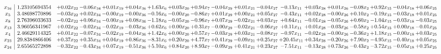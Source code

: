 \documentclass[9pt]{article}
\begin{document}
 \[\begin{array}{c| c c@{\hskip 2pt} c@{\hskip 2pt} c@{\hskip 2pt} c@{\hskip 2pt} c@{\hskip 2pt} c@{\hskip 2pt} c@{\hskip 2pt} c@{\hskip 2pt} c@{\hskip 2pt} c@{\hskip 2pt} c@{\hskip 2pt} c@{\hskip 2pt} c@{\hskip 2pt} c@{\hskip 2pt} c@{\hskip 2pt} c@{\hskip 2pt} c@{\hskip 2pt} }
 x_{16}   &  1.23105694354 & +  0.02 x_{22} & -0.06 x_{34} & +  0.01 x_{19} & +  0.04 x_{36} & +  1.63 x_{6} & +  0.03 x_{20} & +  0.94 x_{7} & -0.04 x_{29} & +  0.01 x_{21} & -0.04 x_{27} & -0.13 x_{11} & +  0.03 x_{28} & +  0.01 x_{26} & -0.08 x_{2} & +  0.92 x_{15} & -0.04 x_{18} & +  0.06 x_{25}\\
 x_{5}   &  3.48698770896 & -0.03 x_{22} & +  0.02 x_{34} & -0.00 x_{19} & -0.00 x_{36} & -0.16 x_{6} & -0.00 x_{20} & -0.86 x_{7} & +  0.01 x_{29} & +  0.00 x_{21} & +  0.05 x_{27} & -0.43 x_{11} & +  0.02 x_{28} & -0.00 x_{26} & +  0.10 x_{2} & -0.19 x_{15} & -0.03 x_{18} & +  0.01 x_{25}\\
 x_{8}   &  2.76396033633 & -0.02 x_{22} & +  0.06 x_{34} & -0.00 x_{19} & +  0.08 x_{36} & -1.18 x_{6} & -0.05 x_{20} & -0.96 x_{7} & +  0.07 x_{29} & -0.02 x_{21} & +  0.03 x_{27} & +  0.64 x_{11} & -0.01 x_{28} & -0.05 x_{26} & +  0.60 x_{2} & -1.04 x_{15} & -0.03 x_{18} & -0.03 x_{25}\\
 x_{13}   &  3.96056341967 & +  0.02 x_{22} & -0.02 x_{34} & -0.02 x_{19} & -0.03 x_{36} & +  0.62 x_{6} & +  0.00 x_{20} & +  0.31 x_{7} & -0.00 x_{29} & -0.02 x_{21} & -0.06 x_{27} & +  0.11 x_{11} & +  0.01 x_{28} & -0.03 x_{26} & -0.58 x_{2} & +  0.54 x_{15} & +  0.00 x_{18} & -0.01 x_{25}\\
 x_{4}   &  2.46629114325 & +  0.01 x_{22} & -0.07 x_{34} & -0.02 x_{19} & -0.04 x_{36} & +  1.42 x_{6} & +  0.00 x_{20} & +  0.57 x_{7} & -0.03 x_{29} & +  0.03 x_{21} & -0.08 x_{27} & -0.97 x_{11} & -0.02 x_{28} & -0.00 x_{26} & -0.36 x_{2} & +  1.18 x_{15} & -0.00 x_{18} & +  0.03 x_{25}\\
 x_{23}   &  29.8384866406 & +  0.37 x_{22} & +  0.35 x_{34} & +  0.04 x_{19} & +  0.86 x_{36} & -8.31 x_{6} & +  0.20 x_{20} & +  4.77 x_{7} & +  0.41 x_{29} & -0.09 x_{21} & +  0.25 x_{27} & + 20.45 x_{11} & +  0.34 x_{28} & -0.20 x_{26} & +  7.90 x_{2} & -4.95 x_{15} & -0.40 x_{18} & +  0.05 x_{25}\\
 x_{24}   &  2.65565272898 & -0.32 x_{22} & -0.43 x_{34} & +  0.07 x_{19} & -0.51 x_{36} & +  5.10 x_{6} & +  0.84 x_{20} & +  8.93 x_{7} & -0.09 x_{29} & +  0.41 x_{21} & +  0.23 x_{27} & -7.51 x_{11} & -0.13 x_{28} & +  0.73 x_{26} & -0.43 x_{2} & -3.72 x_{15} & -0.05 x_{18} & +  0.25 x_{25}\\

\end{array}\]
\end{document}
